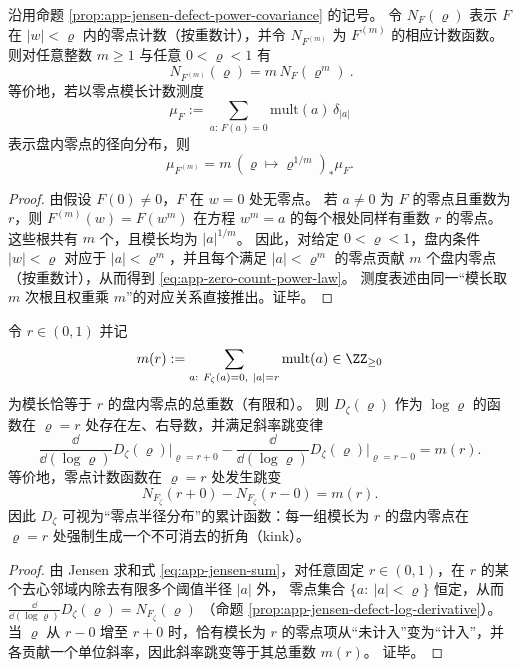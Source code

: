 \begin{corollary}\label{cor:app-jensen-zero-count-power-law}
沿用命题 \ref{prop:app-jensen-defect-power-covariance} 的记号。
令 \(N_F(\varrho)\) 表示 \(F\) 在 \(|w|<\varrho\) 内的零点计数（按重数计），并令 \(N_{F^{(m)}}\) 为 \(F^{(m)}\) 的相应计数函数。
则对任意整数 \(m\ge 1\) 与任意 \(0<\varrho<1\) 有
\begin{equation}\label{eq:app-zero-count-power-law}
\boxed{\ N_{F^{(m)}}(\varrho)=m\,N_F(\varrho^m)\ }.
\end{equation}
等价地，若以零点模长计数测度
\[
\mu_F:=\sum_{a:\,F(a)=0}\mathrm{mult}(a)\,\delta_{|a|}
\]
表示盘内零点的径向分布，则
\[
\mu_{F^{(m)}}=m\,(\varrho\mapsto \varrho^{1/m})_{\ast}\mu_F.
\]
\end{corollary}
\begin{proof}
由假设 \(F(0)\neq 0\)，\(F\) 在 \(w=0\) 处无零点。
若 \(a\neq 0\) 为 \(F\) 的零点且重数为 \(r\)，则 \(F^{(m)}(w)=F(w^m)\) 在方程 \(w^m=a\) 的每个根处同样有重数 \(r\) 的零点。
这些根共有 \(m\) 个，且模长均为 \(|a|^{1/m}\)。
因此，对给定 \(0<\varrho<1\)，盘内条件 \(|w|<\varrho\) 对应于 \(|a|<\varrho^m\)，并且每个满足 \(|a|<\varrho^m\) 的零点贡献 \(m\) 个盘内零点（按重数计），从而得到 \eqref{eq:app-zero-count-power-law}。
测度表述由同一“模长取 \(m\) 次根且权重乘 \(m\)”的对应关系直接推出。证毕。
\end{proof}

\begin{corollary}\label{cor:app-jensen-defect-kink-structure}
令 \(r\in(0,1)\) 并记
\[
m(r):=\sum_{a:\ F_{\zeta}(a)=0,\ |a|=r}\mathrm{mult}(a)\in\ZZ_{\ge 0}
\]
为模长恰等于 \(r\) 的盘内零点的总重数（有限和）。
则 \(D_{\zeta}(\varrho)\) 作为 \(\log\varrho\) 的函数在 \(\varrho=r\) 处存在左、右导数，并满足斜率跳变律
\[
\frac{\dd}{\dd(\log\varrho)}D_{\zeta}(\varrho)\Big|_{\varrho=r+0}
-\frac{\dd}{\dd(\log\varrho)}D_{\zeta}(\varrho)\Big|_{\varrho=r-0}
=m(r).
\]
等价地，零点计数函数在 \(\varrho=r\) 处发生跳变
\[
N_{F_{\zeta}}(r+0)-N_{F_{\zeta}}(r-0)=m(r).
\]
因此 \(D_{\zeta}\) 可视为“零点半径分布”的累计函数：每一组模长为 \(r\) 的盘内零点在 \(\varrho=r\) 处强制生成一个不可消去的折角（kink）。
\end{corollary}
\begin{proof}
由 Jensen 求和式 \eqref{eq:app-jensen-sum}，对任意固定 \(r\in(0,1)\)，在 \(r\) 的某个去心邻域内除去有限多个阈值半径 \(|a|\) 外，
零点集合 \(\{a:\ |a|<\varrho\}\) 恒定，从而
\(
\frac{\dd}{\dd(\log\varrho)}D_{\zeta}(\varrho)=N_{F_{\zeta}}(\varrho)
\)
（命题 \ref{prop:app-jensen-defect-log-derivative}）。
当 \(\varrho\) 从 \(r-0\) 增至 \(r+0\) 时，恰有模长为 \(r\) 的零点项从“未计入”变为“计入”，并各贡献一个单位斜率，因此斜率跳变等于其总重数 \(m(r)\)。
证毕。
\end{proof}


